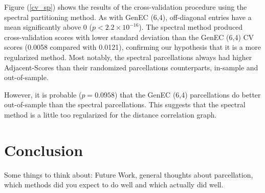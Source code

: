 Figure (\ref{cv_sp}) shows the results of the cross-validation procedure
using the spectral partitioning method. As with GenEC (6,4),
off-diagonal entries have a mean significantly above 0
($p < 2.2 \times 10^{-16}$). The spectral method produced
cross-validation scores with lower standard deviation than the GenEC
(6,4) CV scores (0.0058 compared with 0.0121), confirming our hypothesis
that it is a more regularized method. Most notably, the spectral
parcellations always had higher Adjacent-Scores than their randomized
parcellations counterparts, in-sample and out-of-sample.

However, it is probable ($p = 0.0958$) that the GenEC (6,4)
parcellations do better out-of-sample than the spectral parcellations.
This suggests that the spectral method is a little too regularized for
the distance correlation graph.

\section{Conclusion}

{\color{red}Some things to think about: Future Work, general thoughts
about parcellation, which methods did you expect to do well and which
actually did well.}
